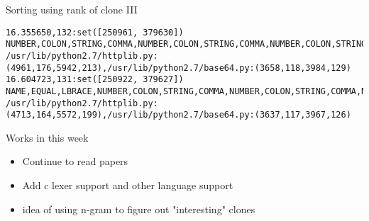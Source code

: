 \begin{frame}[shrink=30,fragile]{Sorting using rank of clone III}
\lstset{
    breaklines=true
}
\begin{lstlisting}
16.355650,132:set([250961, 379630])	NUMBER,COLON,STRING,COMMA,NUMBER,COLON,STRING,COMMA,NUMBER,COLON,STRING,COMMA,NUMBER,COLON,STRING,COMMA,NUMBER,COLON,STRING,COMMA,NUMBER,COLON,STRING,COMMA,NUMBER,COLON,STRING,COMMA,NUMBER,COLON,STRING,COMMA,NUMBER,COLON,STRING,COMMA,NUMBER,COLON,STRING,COMMA,NUMBER,COLON,STRING,COMMA,NUMBER,COLON,STRING,COMMA,NUMBER,COLON,STRING,COMMA,NUMBER,COLON,STRING,COMMA,NUMBER,COLON,STRING,COMMA,NUMBER,COLON,STRING,COMMA,NUMBER,COLON,STRING,COMMA,NUMBER,COLON,STRING,COMMA,NUMBER,COLON,STRING,COMMA,NUMBER,COLON,STRING,COMMA,NUMBER,COLON,STRING,COMMA,NUMBER,COLON,STRING,COMMA,NUMBER,COLON,STRING,COMMA,NUMBER,COLON,STRING,COMMA,NUMBER,COLON,STRING,COMMA,NUMBER,COLON,STRING,COMMA,NUMBER,COLON,STRING,COMMA,NUMBER,COLON,STRING,COMMA,NUMBER,COLON,STRING,COMMA,NUMBER,COLON,STRING,COMMA,NUMBER,COLON,STRING,COMMA,NUMBER,COLON,STRING,COMMA,RBRACE,NEWLINE,NAME,EQUAL	/usr/lib/python2.7/httplib.py:(4961,176,5942,213),/usr/lib/python2.7/base64.py:(3658,118,3984,129)
16.604723,131:set([250922, 379627])	NAME,EQUAL,LBRACE,NUMBER,COLON,STRING,COMMA,NUMBER,COLON,STRING,COMMA,NUMBER,COLON,STRING,COMMA,NUMBER,COLON,STRING,COMMA,NUMBER,COLON,STRING,COMMA,NUMBER,COLON,STRING,COMMA,NUMBER,COLON,STRING,COMMA,NUMBER,COLON,STRING,COMMA,NUMBER,COLON,STRING,COMMA,NUMBER,COLON,STRING,COMMA,NUMBER,COLON,STRING,COMMA,NUMBER,COLON,STRING,COMMA,NUMBER,COLON,STRING,COMMA,NUMBER,COLON,STRING,COMMA,NUMBER,COLON,STRING,COMMA,NUMBER,COLON,STRING,COMMA,NUMBER,COLON,STRING,COMMA,NUMBER,COLON,STRING,COMMA,NUMBER,COLON,STRING,COMMA,NUMBER,COLON,STRING,COMMA,NUMBER,COLON,STRING,COMMA,NUMBER,COLON,STRING,COMMA,NUMBER,COLON,STRING,COMMA,NUMBER,COLON,STRING,COMMA,NUMBER,COLON,STRING,COMMA,NUMBER,COLON,STRING,COMMA,NUMBER,COLON,STRING,COMMA,NUMBER,COLON,STRING,COMMA,NUMBER,COLON,STRING,COMMA,NUMBER,COLON,STRING,COMMA,NUMBER,COLON,STRING,COMMA,NUMBER,COLON,STRING,COMMA	/usr/lib/python2.7/httplib.py:(4713,164,5572,199),/usr/lib/python2.7/base64.py:(3637,117,3967,126)
\end{lstlisting}

\end{frame}

\begin{frame}{Works in this week}
\begin{itemize}
\item Continue to read papers
\item Add c lexer support and other language support
\item idea of using n-gram to figure out "interesting" clones
\end{itemize}
\end{frame}


